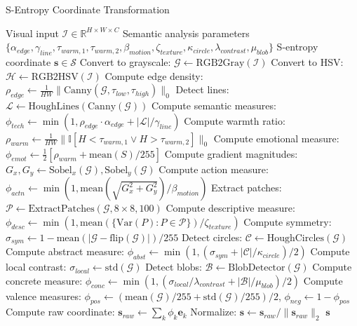 \documentclass[11pt,a4paper]{article}
\begin{document}
\begin{algorithm}
\caption{S-Entropy Coordinate Transformation}
\label{alg:s-entropy-transform}
\begin{algorithmic}[1]
\REQUIRE Visual input $\mathcal{I} \in \mathbb{R}^{H \times W \times C}$
\REQUIRE Semantic analysis parameters $\{\alpha_{edge}, \gamma_{line}, \tau_{warm,1}, \tau_{warm,2}, \beta_{motion}, \zeta_{texture}, \kappa_{circle}, \lambda_{contrast}, \mu_{blob}\}$
\ENSURE S-entropy coordinate $\mathbf{s} \in \mathcal{S}$
\STATE Convert to grayscale: $\mathcal{G} \leftarrow \text{RGB2Gray}(\mathcal{I})$
\STATE Convert to HSV: $\mathcal{H} \leftarrow \text{RGB2HSV}(\mathcal{I})$
\STATE Compute edge density: $\rho_{edge} \leftarrow \frac{1}{HW}\|\text{Canny}(\mathcal{G}, \tau_{low}, \tau_{high})\|_0$
\STATE Detect lines: $\mathcal{L} \leftarrow \text{HoughLines}(\text{Canny}(\mathcal{G}))$
\STATE Compute semantic measures: $\phi_{tech} \leftarrow \min(1, \rho_{edge} \cdot \alpha_{edge} + |\mathcal{L}|/\gamma_{line})$
\STATE Compute warmth ratio: $\rho_{warm} \leftarrow \frac{1}{HW}\|\mathbb{I}[H < \tau_{warm,1} \vee H > \tau_{warm,2}]\|_0$
\STATE Compute emotional measure: $\phi_{emot} \leftarrow \frac{1}{2}[\rho_{warm} + \text{mean}(S)/255]$
\STATE Compute gradient magnitudes: $G_x, G_y \leftarrow \text{Sobel}_x(\mathcal{G}), \text{Sobel}_y(\mathcal{G})$
\STATE Compute action measure: $\phi_{actn} \leftarrow \min(1, \text{mean}(\sqrt{G_x^2 + G_y^2})/\beta_{motion})$
\STATE Extract patches: $\mathcal{P} \leftarrow \text{ExtractPatches}(\mathcal{G}, 8 \times 8, 100)$
\STATE Compute descriptive measure: $\phi_{desc} \leftarrow \min(1, \text{mean}(\{\text{Var}(P) : P \in \mathcal{P}\})/\zeta_{texture})$
\STATE Compute symmetry: $\sigma_{sym} \leftarrow 1 - \text{mean}(|\mathcal{G} - \text{flip}(\mathcal{G})|)/255$
\STATE Detect circles: $\mathcal{C} \leftarrow \text{HoughCircles}(\mathcal{G})$
\STATE Compute abstract measure: $\phi_{abst} \leftarrow \min(1, (\sigma_{sym} + |\mathcal{C}|/\kappa_{circle})/2)$
\STATE Compute local contrast: $\sigma_{local} \leftarrow \text{std}(\mathcal{G})$
\STATE Detect blobs: $\mathcal{B} \leftarrow \text{BlobDetector}(\mathcal{G})$
\STATE Compute concrete measure: $\phi_{conc} \leftarrow \min(1, (\sigma_{local}/\lambda_{contrast} + |\mathcal{B}|/\mu_{blob})/2)$
\STATE Compute valence measures: $\phi_{pos} \leftarrow (\text{mean}(\mathcal{G})/255 + \text{std}(\mathcal{G})/255)/2$, $\phi_{neg} \leftarrow 1 - \phi_{pos}$
\STATE Compute raw coordinate: $\mathbf{s}_{raw} \leftarrow \sum_k \phi_k \mathbf{e}_k$
\STATE Normalize: $\mathbf{s} \leftarrow \mathbf{s}_{raw} / \|\mathbf{s}_{raw}\|_2$
\RETURN $\mathbf{s}$
\end{algorithmic}
\end{algorithm}
\end{document}

